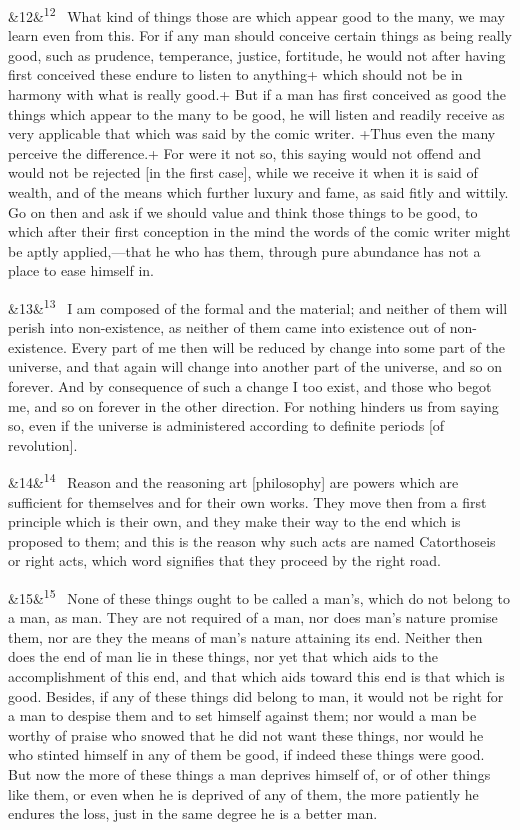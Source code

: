 \documentclass[12pt]{article}
\newcommand{\para}[1][]{\par\noindent\ifx&#1&\else\textsuperscript{\footnotesize #1}~\fi}
\begin{document}
\para[12] What kind of things those are which appear good to the many, we may
learn even from this. For if any man should conceive certain things as
being really good, such as prudence, temperance, justice, fortitude, he
would not after having first conceived these endure to listen to
anything+ which should not be in harmony with what is really good.+ But
if a man has first conceived as good the things which appear to the many
to be good, he will listen and readily receive as very applicable that
which was said by the comic writer. +Thus even the many perceive the
difference.+ For were it not so, this saying would not offend and would
not be rejected [in the first case], while we receive it when it is said
of wealth, and of the means which further luxury and fame, as said fitly
and wittily. Go on then and ask if we should value and think those
things to be good, to which after their first conception in the mind the
words of the comic writer might be aptly applied,---that he who has them,
through pure abundance has not a place to ease himself in.

\para[13] I am composed of the formal and the material; and neither of them
will perish into non-existence, as neither of them came into existence
out of non-existence. Every part of me then will be reduced by change
into some part of the universe, and that again will change into another
part of the universe, and so on forever. And by consequence of such a
change I too exist, and those who begot me, and so on forever in the
other direction. For nothing hinders us from saying so, even if the
universe is administered according to definite periods [of revolution].

\para[14] Reason and the reasoning art [philosophy] are powers which are
sufficient for themselves and for their own works. They move then from a
first principle which is their own, and they make their way to the end
which is proposed to them; and this is the reason why such acts are
named Catorthoseis or right acts, which word signifies that they proceed
by the right road.

\para[15] None of these things ought to be called a man's, which do not belong
to a man, as man. They are not required of a man, nor does man's nature
promise them, nor are they the means of man's nature attaining its end.
Neither then does the end of man lie in these things, nor yet that which
aids to the accomplishment of this end, and that which aids toward this
end is that which is good. Besides, if any of these things did belong to
man, it would not be right for a man to despise them and to set himself
against them; nor would a man be worthy of praise who snowed that he did
not want these things, nor would he who stinted himself in any of them
be good, if indeed these things were good. But now the more of these
things a man deprives himself of, or of other things like them, or even
when he is deprived of any of them, the more patiently he endures the
loss, just in the same degree he is a better man.
\end{document}
